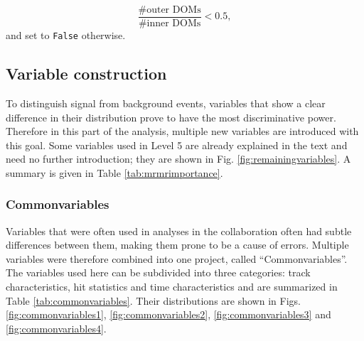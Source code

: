 \begin{equation}
\frac{\# \textrm{outer DOMs}}{\#\textrm{inner DOMs}} < 0.5,
\end{equation}
\noindent and set to \texttt{False} otherwise.

\subsection{Variable construction}
To distinguish signal from background events, variables that show a clear difference in their distribution prove to have the most discriminative power. Therefore in this part of the analysis, multiple new variables are introduced with this goal. Some variables used in Level 5 are already explained in the text and need no further introduction; they are shown in Fig. \ref{fig:remainingvariables}. A summary is given in Table \ref{tab:mrmrimportance}.

\subsubsection{Commonvariables}
\label{subsub:commonvariables}
Variables that were often used in analyses in the collaboration often had subtle differences between them, making them prone to be a cause of errors. Multiple variables were therefore combined into one project, called ``Commonvariables''. The variables used here can be subdivided into three categories: track characteristics, hit statistics and time characteristics and are summarized in Table \ref{tab:commonvariables}. Their distributions are shown in Figs. \ref{fig:commonvariables1}, \ref{fig:commonvariables2}, \ref{fig:commonvariables3} and \ref{fig:commonvariables4}.


